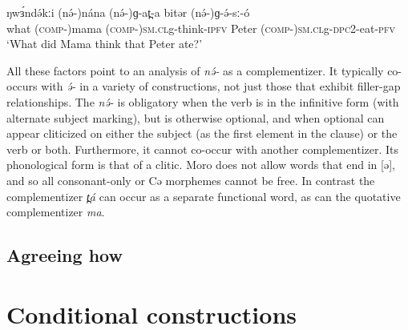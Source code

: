 \ea
\gll	ŋwɜ́ndə́kːi	(nə́-)nána	(nə́-)ɡ-at̪-a	bitər (nə́-)ɡ-ə́-sː-ó \\
what	(\textsc{comp-})mama	(\textsc{comp-})\textsc{sm.cl}g-think-\textsc{ipfv}	Peter (\textsc{comp-})\textsc{sm.cl}g-\textsc{dpc}2-eat-\textsc{pfv}\\
\trans ‘What did Mama think that Peter ate?’\\
\z

All these factors point to an analysis of \textit{nə́-} as a complementizer. It typically co-occurs with \textit{ə́-} in a variety of constructions, not just those that exhibit filler-gap relationships. The \textit{nə́-} is obligatory when the verb is in the infinitive form (with alternate subject marking), but is otherwise optional, and when optional can appear cliticized on either the subject (as the first element in the clause) or the verb or both. Furthermore, it cannot co-occur with another complementizer. Its phonological form is that of a clitic. Moro does not allow words that end in [ə], and so all consonant-only or Cə morphemes cannot be free. In contrast the complementizer \textit{t̪á} can occur as a separate functional word, as can the quotative complementizer \textit{ma}.

\subsection{Agreeing how}\label{how}


\section{Conditional constructions}

